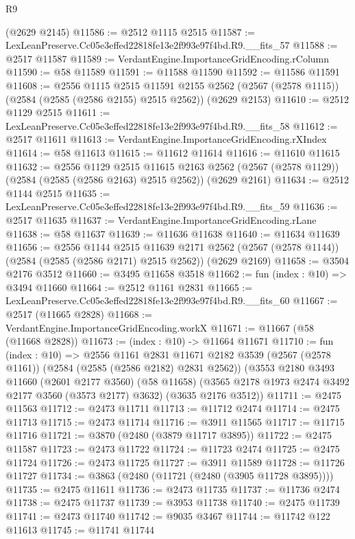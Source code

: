 \begin{lexlean}{R9}
\begin{coremodule}
    (@2629 @2145)
@11586 := @2512 @1115 @2515
@11587 := LexLeanPreserve.Cc05e3effed22818fe13e2f993e97f4bd.R9.__fits_57
@11588 := @2517 @11587
@11589 := VerdantEngine.ImportanceGridEncoding.rColumn
@11590 := @58 @11589
@11591 := @11588 @11590
@11592 := @11586 @11591
@11608 := @2556
    @1115
    @2515
    @11591
    @2155
    @2562
    (@2567 (@2578 @1115))
    (@2584 (@2585 (@2586 @2155) @2515 @2562))
    (@2629 @2153)
@11610 := @2512 @1129 @2515
@11611 := LexLeanPreserve.Cc05e3effed22818fe13e2f993e97f4bd.R9.__fits_58
@11612 := @2517 @11611
@11613 := VerdantEngine.ImportanceGridEncoding.rXIndex
@11614 := @58 @11613
@11615 := @11612 @11614
@11616 := @11610 @11615
@11632 := @2556
    @1129
    @2515
    @11615
    @2163
    @2562
    (@2567 (@2578 @1129))
    (@2584 (@2585 (@2586 @2163) @2515 @2562))
    (@2629 @2161)
@11634 := @2512 @1144 @2515
@11635 := LexLeanPreserve.Cc05e3effed22818fe13e2f993e97f4bd.R9.__fits_59
@11636 := @2517 @11635
@11637 := VerdantEngine.ImportanceGridEncoding.rLane
@11638 := @58 @11637
@11639 := @11636 @11638
@11640 := @11634 @11639
@11656 := @2556
    @1144
    @2515
    @11639
    @2171
    @2562
    (@2567 (@2578 @1144))
    (@2584 (@2585 (@2586 @2171) @2515 @2562))
    (@2629 @2169)
@11658 := @3504 @2176 @3512
@11660 := @3495 @11658 @3518
@11662 := fun (index : @10) => @3494 @11660
@11664 := @2512 @1161 @2831
@11665 := LexLeanPreserve.Cc05e3effed22818fe13e2f993e97f4bd.R9.__fits_60
@11667 := @2517 (@11665 @2828)
@11668 := VerdantEngine.ImportanceGridEncoding.workX
@11671 := @11667 (@58 (@11668 @2828))
@11673 := (index : @10) -> @11664 @11671
@11710 := fun (index : @10) =>
  @2556
    @1161
    @2831
    @11671
    @2182
    @3539
    (@2567 (@2578 @1161))
    (@2584 (@2585 (@2586 @2182) @2831 @2562))
    (@3553
      @2180
      @3493
      @11660
      (@2601 @2177 @3560)
      (@58 @11658)
      (@3565 @2178 @1973 @2474 @3492 @2177 @3560 (@3573 @2177) @3632)
      (@3635 @2176 @3512))
@11711 := @2475 @11563
@11712 := @2473 @11711
@11713 := @11712 @2474
@11714 := @2475 @11713
@11715 := @2473 @11714
@11716 := @3911 @11565
@11717 := @11715 @11716
@11721 := @3870 (@2480 (@3879 @11717 @3895))
@11722 := @2475 @11587
@11723 := @2473 @11722
@11724 := @11723 @2474
@11725 := @2475 @11724
@11726 := @2473 @11725
@11727 := @3911 @11589
@11728 := @11726 @11727
@11734 := @3863 (@2480 (@11721 (@2480 (@3905 @11728 @3895))))
@11735 := @2475 @11611
@11736 := @2473 @11735
@11737 := @11736 @2474
@11738 := @2475 @11737
@11739 := @3953 @11738
@11740 := @2475 @11739
@11741 := @2473 @11740
@11742 := @9035 @3467
@11744 := @11742 @122 @11613
@11745 := @11741 @11744

\end{coremodule}
\end{lexlean}
